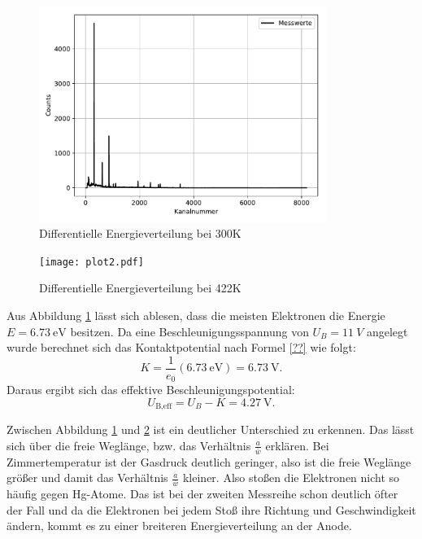 \begin{figure}[H]
  \centering
  \includegraphics[height=7cm]{plot1.pdf}
  \caption{Differentielle Energieverteilung bei 300\;K }
  \label{fig:plot1}
\end{figure}

 \begin{figure}[H]
   \centering
   \texttt{[image: plot2.pdf]}
   \caption{Differentielle Energieverteilung bei 422\;K}
   \label{fig:plot2}
 \end{figure}

Aus Abbildung \ref{fig:plot1} lässt sich ablesen, dass die meisten Elektronen
die Energie $E=\SI{6,73}{\eV}$ besitzen.
Da eine Beschleunigungsspannung von $U_B=\SI{11}{V}$ angelegt wurde berechnet sich das
Kontaktpotential nach Formel \ref{??} wie folgt:
\begin{equation}
  K=\frac{1}{e_0}(\SI{6,73}{\eV})=\SI{6,73}{\V}.
  \label{kontakt}
\end{equation}
Daraus ergibt sich das effektive Beschleunigungspotential:
\begin{equation}
  U_{\text{B,eff}}= U_B -K =\SI{4,27}{\V}.
\end{equation}

Zwischen Abbildung \ref{fig:plot1} und \ref{fig:plot2} ist ein deutlicher
Unterschied zu erkennen. Das lässt sich über die freie Weglänge, bzw. das Verhältnis
$\frac{a}{\bar{w}}$ erklären. Bei Zimmertemperatur ist der Gasdruck deutlich geringer,
also ist die freie Weglänge größer und damit das Verhältnis $\frac{a}{\bar{w}}$
kleiner. Also stoßen die Elektronen nicht so häufig gegen Hg-Atome. Das ist bei der zweiten
Messreihe schon deutlich öfter der Fall und da die Elektronen bei jedem Stoß ihre
Richtung und Geschwindigkeit ändern, kommt es zu einer breiteren Energieverteilung
an der Anode.

